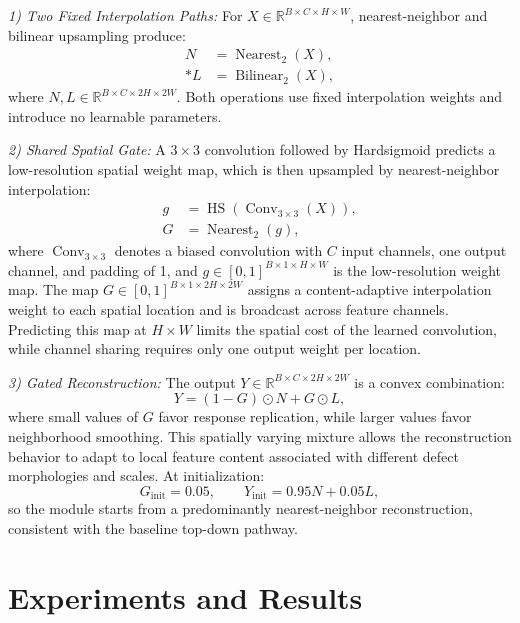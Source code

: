 \documentclass[a4paper,fleqn]{cas-dc}
\begin{document}
\emph{1) Two Fixed Interpolation Paths:}
For $X\in\mathbb{R}^{B\times C\times H\times W}$, nearest-neighbor and bilinear upsampling produce:
\begin{align}
N &= \operatorname{Nearest}_{2}(X), \label{eq:giu-paths}\\*
L &= \operatorname{Bilinear}_{2}(X), \label{eq:giu-bilinear}
\end{align}
\noindent where $N,L\in\mathbb{R}^{B\times C\times2H\times2W}$. Both operations use fixed interpolation weights and introduce no learnable parameters.

\emph{2) Shared Spatial Gate:}
A $3\times3$ convolution followed by Hardsigmoid predicts a low-resolution spatial weight map, which is then upsampled by nearest-neighbor interpolation:
\begin{align}
g &= \operatorname{HS}(\operatorname{Conv}_{3\times3}(X)), \label{eq:giu-gate-lowres}\\
G &= \operatorname{Nearest}_{2}(g), \label{eq:giu-gate}
\end{align}
\noindent where $\operatorname{Conv}_{3\times3}$ denotes a biased convolution with $C$ input channels, one output channel, and padding of 1, and $g\in[0,1]^{B\times1\times H\times W}$ is the low-resolution weight map. The map $G\in[0,1]^{B\times1\times2H\times2W}$ assigns a content-adaptive interpolation weight to each spatial location and is broadcast across feature channels. Predicting this map at $H\times W$ limits the spatial cost of the learned convolution, while channel sharing requires only one output weight per location.

\emph{3) Gated Reconstruction:}
The output $Y\in\mathbb{R}^{B\times C\times2H\times2W}$ is a convex combination:
\begin{equation}
Y=(1-G)\odot N+G\odot L,
\label{eq:giu-mixture}
\end{equation}
\noindent where small values of $G$ favor response replication, while larger values favor neighborhood smoothing. This spatially varying mixture allows the reconstruction behavior to adapt to local feature content associated with different defect morphologies and scales. At initialization:
\begin{equation}
G_{\mathrm{init}}=0.05,\qquad Y_{\mathrm{init}}=0.95N+0.05L,
\label{eq:giu-initialization}
\end{equation}
\noindent so the module starts from a predominantly nearest-neighbor reconstruction, consistent with the baseline top-down pathway.

\section{Experiments and Results}
\label{sec:results}
\end{document}
